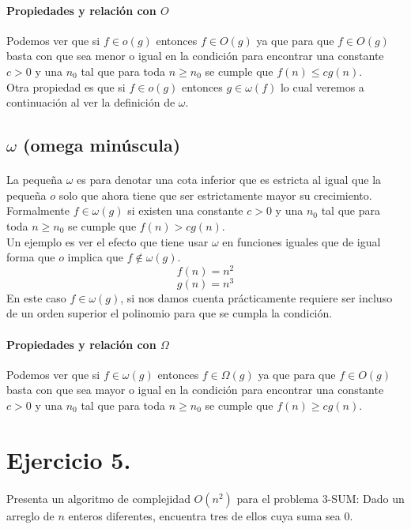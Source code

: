 \documentclass[12pt]{article}
\begin{document}
\paragraph{Propiedades y relación con $O$} Podemos ver que si $f\in o(g)$ entonces $f\in O(g)$ ya que para que $f\in O(g)$ basta con que sea menor o igual en la condición para encontrar una constante $c>0$ y una $n_{0}$ tal que para toda $n\geq n_{0}$ se cumple que $f(n)\leq cg(n)$.  \\
Otra propiedad es que si $f\in o(g)$ entonces $g\in\omega(f)$ lo cual veremos a continuación al ver la definición de $\omega$.
\subsection{$\omega$ (omega minúscula)}
\paragraph{} La pequeña $\omega$ es para denotar una cota inferior que es estricta al igual que la pequeña $o$ solo que ahora tiene que ser estrictamente mayor su crecimiento. Formalmente $f\in\omega(g)$ si existen una constante $c>0$ y una $n_{0}$ tal que para toda $n\geq n_{0}$ se cumple que $f(n)>cg(n)$.\\
Un ejemplo es ver el efecto que tiene usar $\omega$ en funciones iguales que de igual forma que $o$ implica que $f\notin\omega(g)$.
\begin{equation}\label{f2_ej4.2}
f(n) = n^{2}
\end{equation}
\begin{equation}\label{g2_ej4.2}
g(n) = n^{3}
\end{equation}
En este caso $f\in\omega(g)$, si nos damos cuenta prácticamente requiere ser incluso de un orden superior el polinomio para que se cumpla la condición.
\paragraph{Propiedades y relación con $\Omega$} Podemos ver que si $f\in \omega(g)$ entonces $f\in \Omega(g)$ ya que para que $f\in O(g)$ basta con que sea mayor o igual en la condición para encontrar una constante $c>0$ y una $n_{0}$ tal que para toda $n\geq n_{0}$ se cumple que $f(n)\geq cg(n)$. 
\section{Ejercicio 5.}
\paragraph{} Presenta un algoritmo de complejidad $O(n^{2})$ para el problema 3-SUM: Dado un arreglo de $n$ enteros diferentes, encuentra tres de ellos cuya suma sea 0. 
\end{document}
